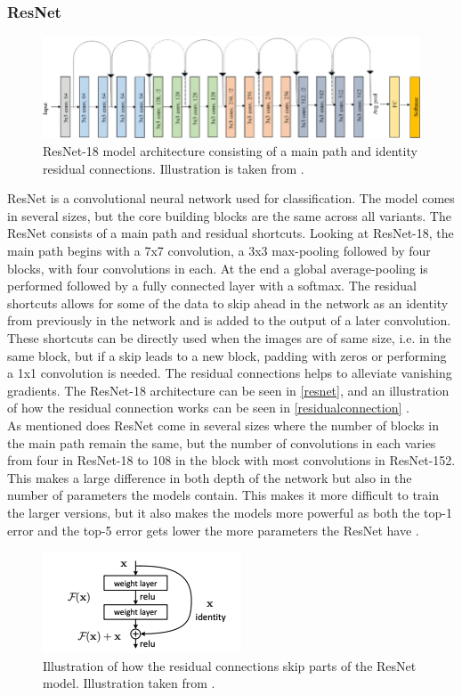 \subsubsection{ResNet}
\begin{figure}[H]
	\centering
	\includegraphics[width=\linewidth]{Materials/Theory/resnet}
	\caption{ResNet-18 model architecture consisting of a main path and identity residual connections. Illustration is taken from \cite{resnetModel}.}
	\label{resnet}
\end{figure}
ResNet is a convolutional neural network used for classification. The model comes in several sizes, but the core building blocks are the same across all variants. The ResNet consists of a main path and residual shortcuts. Looking at ResNet-18, the main path begins with a 7x7 convolution, a 3x3 max-pooling followed by four blocks, with four convolutions in each. At the end a global average-pooling is performed followed by a fully connected layer with a softmax. The residual shortcuts allows for some of the data to skip ahead in the network as an identity from previously in the network and is added to the output of a later convolution. These shortcuts can be directly used when the images are of same size, i.e. in the same block, but if a skip leads to a new block, padding with zeros or performing a 1x1 convolution is needed. The residual connections helps to alleviate vanishing gradients. The ResNet-18 architecture can be seen in \autoref{resnet}, and an illustration of how the residual connection works can be seen in \autoref{residualconnection} \cite{resnetPaper}.\\
As mentioned does ResNet come in several sizes where the number of blocks in the main path remain the same, but the number of convolutions in each varies from four in ResNet-18 to 108 in the block with most convolutions in ResNet-152. This makes a large difference in both depth of the network but also in the number of parameters the models contain. This makes it more difficult to train the larger versions, but it also makes the models more powerful as both the top-1 error and the top-5 error gets lower the more parameters the ResNet have \cite{resnet}.
\begin{figure}
	\centering
	\includegraphics[width=0.5\linewidth]{Materials/Theory/ResidualConnection}
	\caption{Illustration of how the residual connections skip parts of the ResNet model. Illustration taken from \cite{resnetPaper}.}
	\label{residualconnection}
\end{figure}

